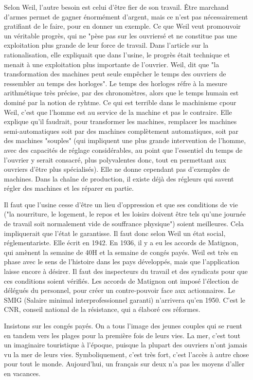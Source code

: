 \documentclass[a4paper,12pt]{book}
\begin{document}
\par Selon Weil, l'autre besoin est celui d'être fier de son travail. Être marchand d'armes permet de gagner énormément d'argent, mais ce n'est pas nécessairement gratifiant de le faire, pour en donner un exemple. Ce que Weil veut promouvoir un véritable progrès, qui ne "pèse pas sur les ouvriersé et ne constitue pas une exploitation plus grande de leur force de travail. Dans l'article sur la rationalisation, elle expliquait que dans l'usine, le progrès était technique et menait à une exploitation plus importante de l'ouvrier. Weil, dit que "la transformation des machines peut seule empêcher le temps des ouvriers de ressembler au temps des horloges". Le temps des horloges réfre à la mesure arithmétique très précise, par des chronomètres, alors que le temps humain est dominé par la notion de ryhtme. Ce qui est terrible dans le machinisme cpour Weil, c'est que l'homme est au service de la machine et pas le contraire. Elle explique qu'il faudrait, pour transformer les machines, remplacer les machines semi-automatiques soit par des machines complètement automatiques, soit par des machines "souples" (qui impliquent une plus grande intervention de l'homme, avec des capacités de réglage considérables, au point que l'essentiel du temps de l'ouvrier y serait consacré, plus polyvalentes donc, tout en permettant aux ouvriers d'être plus spécialisés). Elle ne donne cependant pas d'exemples de machines. Dans la chaîne de production, il existe déjà des régleurs qui savent régler des machines et les réparer en partie.
\par Il faut que l'usine cesse d'être un lieu d'oppression et que ses conditions de vie ("la nourriture, le logement, le repos et les loisirs doivent être tels qu'une journée de travail soit normalement vide de souffrance physique") soient meilleures. Cela impliquerait que l'état le garantisse. Il faut donc selon Weil un état social, réglementariste. Elle écrit en 1942. En 1936, il y a eu les accords de Matignon, qui amènent la semaine de 40H et la semaine de congés payés. Weil est très en phase avec le sens de l'histoire dans les pays développés, mais que l'application laisse encore à désirer. Il faut des inspecteurs du travail et des syndicats pour que ces conditions soient vérifiés. Les accords de Matignon ont imposé l'élection de délégués du personnel, pour créer un contre-pouvoir face aux actionnaires. Le SMIG (Salaire minimal interprofessionnel garanti) n'arrivera qu'en 1950. C'est le CNR, conseil national de la résistance, qui a élaboré ces réformes.
\par Insistons sur les congés payés. On a tous l'image des jeunes couples qui se ruent en tandem vers les plages pour la première fois de leurs vies. La mer, c'est tout un imaginaire touristique à l'époque, puisque la plupart des ouvriers n'ont jamais vu la mer de leurs vies. Symboliquement, c'est très fort, c'est l'accès à autre chose pour tout le monde. Aujourd'hui, un français sur deux n'a pas les moyens d'aller en vacances.
\end{document}
